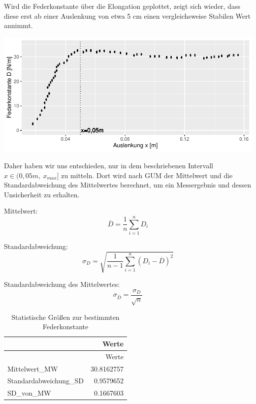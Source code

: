 \documentclass[
  9pt,
]{article}
\begin{document}
Wird die Federkonstante über die Elongation geplottet, zeigt sich
wieder, dass diese erst ab einer Auslenkung von etwa 5 cm einen
vergleichsweise Stabilen Wert annimmt.

\begin{center}\includegraphics{DehnbareStoffe_files/figure-latex/unnamed-chunk-9-1} \end{center}

Daher haben wir uns entschieden, nur in dem beschriebenen Intervall
\(x \in (0,05m,\ x_{max}]\) zu mitteln. Dort wird nach GUM der
Mittelwert und die Standardabweichung des Mittelwertes berechnet, um ein
Messergebnis und dessen Unsicherheit zu erhalten.

Mittelwert: \begin{equation}\label{Mittelwert}
\overline{D} = \frac{1}{n}\sum \limits_{i=1}^nD_i
\end{equation}

Standardabweichung: \begin{equation}\label{Standardabweichung}
\sigma_D = \sqrt{\frac{1}{n-1} \sum_{i=1}^n (D_i - \overline{D})^2}
\end{equation}

Standardabweichung des Mittelwertes:
\begin{equation}\label{StandardabweichungDesMittelwertes}
\sigma_{\overline{D}}=\frac{\sigma_D}{\sqrt{n}}
\end{equation}

\begin{longtable}[]{@{}lr@{}}
\caption{Statistische Größen zur bestimmten
Federkonstante}\tabularnewline
\toprule()
& Werte \\
\midrule()
\endfirsthead
\toprule()
& Werte \\
\midrule()
\endhead
Mittelwert\_MW & 30.8162757 \\
Standardabweichung\_SD & 0.9579652 \\
SD\_von\_MW & 0.1667603 \\
\bottomrule()
\end{longtable}
\end{document}
